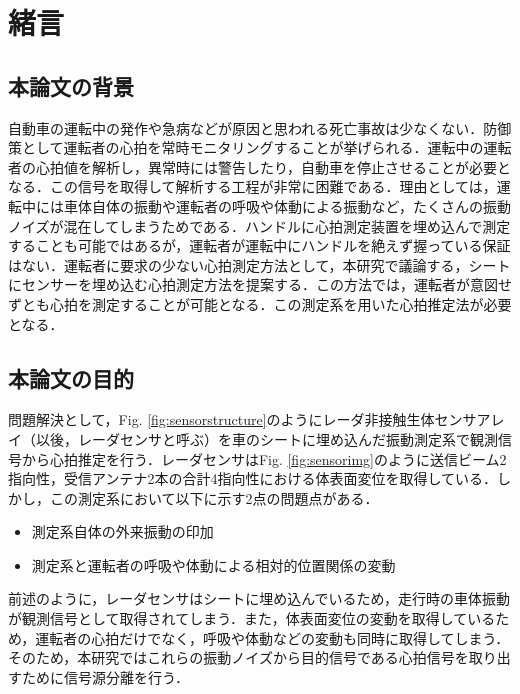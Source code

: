 \chapter{緒言}
\label{chap:intro}

\section{本論文の背景}
自動車の運転中の発作や急病などが原因と思われる死亡事故は少なくない．防御策として運転者の心拍を常時モニタリングすることが挙げられる．運転中の運転者の心拍値を解析し，異常時には警告したり，自動車を停止させることが必要となる．この信号を取得して解析する工程が非常に困難である．理由としては，運転中には車体自体の振動や運転者の呼吸や体動による振動など，たくさんの振動ノイズが混在してしまうためである．ハンドルに心拍測定装置を埋め込んで測定することも可能ではあるが，運転者が運転中にハンドルを絶えず握っている保証はない．運転者に要求の少ない心拍測定方法として，本研究で議論する，シートにセンサーを埋め込む心拍測定方法を提案する．この方法では，運転者が意図せずとも心拍を測定することが可能となる．この測定系を用いた心拍推定法が必要となる．

\section{本論文の目的}
問題解決として，Fig. \ref{fig:sensorstructure}のようにレーダ非接触生体センサアレイ（以後，レーダセンサと呼ぶ）を車のシートに埋め込んだ振動測定系で観測信号から心拍推定を行う．レーダセンサはFig. \ref{fig:sensorimg}のように送信ビーム2指向性，受信アンテナ2本の合計4指向性における体表面変位を取得している．しかし，この測定系において以下に示す2点の問題点がある．

\begin{itemize}
 \item 測定系自体の外来振動の印加
 \item 測定系と運転者の呼吸や体動による相対的位置関係の変動
\end{itemize}

前述のように，レーダセンサはシートに埋め込んでいるため，走行時の車体振動が観測信号として取得されてしまう．また，体表面変位の変動を取得しているため，運転者の心拍だけでなく，呼吸や体動などの変動も同時に取得してしまう．そのため，本研究ではこれらの振動ノイズから目的信号である心拍信号を取り出すために信号源分離を行う．



